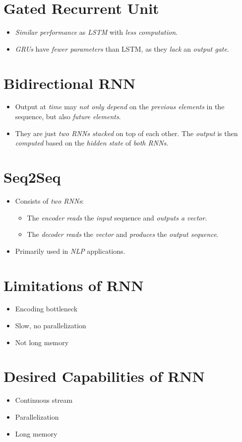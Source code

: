 \documentclass[
	number={10},
	title={Recurrent Neural Networks}
]{cs584notes}
\begin{document}
\section{Gated Recurrent Unit}\label{sec:gated-recurrent-unit}
\begin{itemize}
	\item \emph{Similar performance} as \emph{LSTM} with \emph{less computation}.
	\item \emph{GRUs} have \emph{fewer parameters} than LSTM, as they \emph{lack} an \emph{output gate}.
\end{itemize}

\section{Bidirectional RNN}\label{sec:bidirectional-rnn}
\begin{itemize}
	\item Output at \emph{time}  may \emph{not only depend} on the \emph{previous elements} in the sequence, but also \emph{future elements}.
	\item They are just \emph{two RNNs stacked} on top of each other.
	The \emph{output} is then \emph{computed} based on the \emph{hidden state} of \emph{both RNNs}.
\end{itemize}

\section{Seq2Seq}\label{sec:seq2seq}
\begin{itemize}
	\item Consists of \emph{two RNNs}:
	\begin{itemize}
		\item The \emph{encoder reads} the \emph{input} sequence and \emph{outputs a vector}.
		\item The \emph{decoder reads} the \emph{vector} and \emph{produces} the \emph{output sequence}.
	\end{itemize}
	\item Primarily used in \emph{NLP} applications.
\end{itemize}

\section{Limitations of RNN}\label{sec:limitations-of-rnn}
\begin{itemize}
	\item Encoding bottleneck
	\item Slow, no parallelization
	\item Not long memory
\end{itemize}

\section{Desired Capabilities of RNN}\label{sec:desired-capabilities-of-rnn}
\begin{itemize}
	\item Continuous stream
	\item Parallelization
	\item Long memory
\end{itemize}
\end{document}
